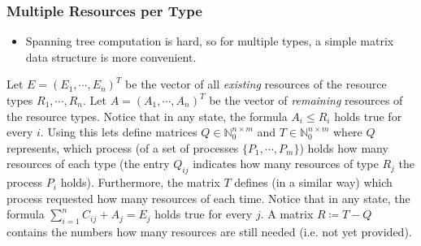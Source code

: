             \subsubsection{Multiple Resources per Type}
                \label{sec:deadlockdetection}
            
                \begin{itemize}
                	\item Spanning tree computation is hard, so for multiple types, a simple matrix data structure is more convenient.
                \end{itemize}
            
                Let \( E = (E_1, \cdots, E_n)^T \) be the vector of all \textit{existing} resources of the resource types \( R_1, \cdots, R_n \). Let \( A = (A_1, \cdots, A_n)^T \) be the vector of \textit{remaining} resources of the resource types. Notice that in any state, the formula \( A_i \leq R_i \) holds true for every \(i\). Using this lets define matrices \( Q \in \mathbb{N}_0^{n \times m} \) and \( T \in \mathbb{N}_0^{n \times m} \) where \(Q\) represents, which process (of a set of processes \( \{ P_1, \cdots, P_m \} \)) holds how many resources of each type (the entry \( Q_{ij} \) indicates how many resources of type \( R_j \) the process \( P_i \) holds). Furthermore, the matrix \(T\) defines (in a similar way) which process requested how many resources of each time. Notice that in any state, the formula \( \sum_{i = 1}^{n} C_{ij} + A_j = E_j \) holds true for every \(j\). A matrix \( R \coloneqq T - Q \) contains the numbers how many resources are still needed (i.e. not yet provided).
                
